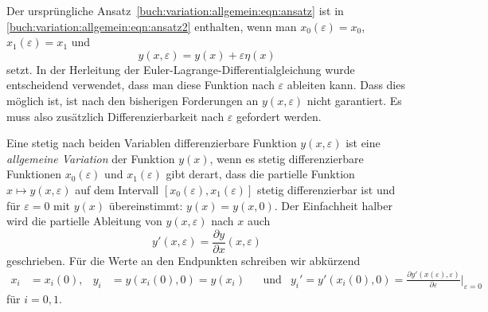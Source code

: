 Der ursprüngliche Ansatz~\eqref{buch:variation:allgemein:eqn:ansatz}
ist in \eqref{buch:variation:allgemein:eqn:ansatz2} enthalten, wenn
man $x_0(\varepsilon)=x_0$, $x_1(\varepsilon)=x_1$ und
\[
y(x,\varepsilon) = y(x) + \varepsilon \eta(x)
\]
setzt.
In der Herleitung der Euler-Lagrange-Differentialgleichung wurde
entscheidend verwendet, dass man diese Funktion nach $\varepsilon$
ableiten kann.
Dass dies möglich ist, ist nach den bisherigen Forderungen an
$y(x,\varepsilon)$ nicht garantiert.
Es muss also zusätzlich Differenzierbarkeit nach $\varepsilon$
gefordert werden.

\begin{definition}
\label{buch:variation:allgemein:def:variation}
Eine stetig nach beiden Variablen differenzierbare Funktion $y(x,\varepsilon)$
ist eine {\em allgemeine Variation} der Funktion $y(x)$, wenn es stetig
differenzierbare Funktionen
$x_0(\varepsilon)$ und $x_1(\varepsilon)$ gibt derart, dass
die partielle Funktion $x\mapsto y(x,\varepsilon)$ auf dem
Intervall $[x_0(\varepsilon),x_1(\varepsilon)]$ stetig differenzierbar
ist und für $\varepsilon=0$ mit $y(x)$ übereinstimmt: $y(x)=y(x,0)$.
Der Einfachheit halber wird die partielle Ableitung von $y(x,\varepsilon)$
nach $x$ auch
\[
y'(x,\varepsilon) = \frac{\partial y}{\partial x}(x,\varepsilon)
\]
geschrieben.
Für die Werte an den Endpunkten schreiben wir abkürzend
\begin{align*}
x_i &= x_i(0),
&
y_i &= y(x_i(0),0) = y(x_i)
&&\text{und}&
y_i'
=
y'(x_i(0),0)
=
\frac{\partial y'(x(\varepsilon),\varepsilon)}{\partial\varepsilon}
\bigg|_{\varepsilon=0}
\end{align*}
für $i=0,1$.
\end{definition}

%
%
